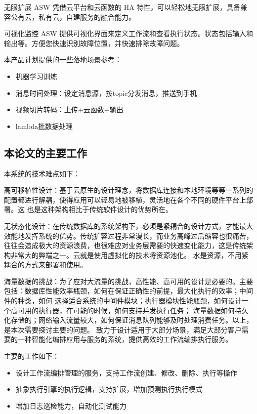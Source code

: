 无限扩展
ASW 凭借云平台和云函数的 HA 特性，可以轻松地无限扩展，具备兼容公有云，私有云，自建服务的融合能力。

可视化监控
ASW 提供可视化界面来定义工作流和查看执行状态。状态包括输入和输出等。方便您快速识别故障位置，并快速排除故障问题。


本产品计划提供的一些落地场景参考：

    \begin{itemize}
        \item 机器学习训练
        \item 消息时间处理：设定消息源，按topic分发消息，推送到手机
        \item 视频切片转码：上传+云函数+输出
        \item lambda批数据处理
    \end{itemize}



\subsection{本论文的主要工作}

本系统的技术难点如下：

高可移植性设计：基于云原生的设计理念，将数据库连接和本地环境等等一系列的配置都进行解耦，使得应用可以轻易地被移植，灵活地在各个不同的硬件平台上部署。这
也是这种架构相比于传统软件设计的优势所在\cite{othe2}。

无状态化设计：在传统数据库的系统架构下，必须是紧耦合的设计方式，才能最大效能地发挥系统的优势。传统扩容过程非常漫长，而业务高峰过后缩容也很痛苦，
往往会造成极大的资源浪费，也很难应对业务层需要的快速变化能力，这是传统架构非常大的弊端之一\cite{kube2021near}。云就是使用虚拟化的技术将资源池化。
水是资源，不用紧耦合的方式来部署和使用\cite{roberson2021dbspdrp}。

海量数据的挑战：为了应对大流量的挑战，高性能、高可用的设计是必要的。主要包括：数据库性能效率瓶颈，如何在保证正确性的前提，最大化执行的效率；中间件的种类，如何
选择适合系统的中间件模块；执行器模块性能瓶颈，如何设计一个高可用的执行器，在可能的时候，如何支持并发执行任务；
海量数据如何持久化存储的；网络输入流量较大，如何保证消息队列能够及时处理消费任务。以上，是本次需要探讨主要的问题。
致力于设计适用于大部分场景，满足大部分客户需要的一种智能化编排应用与服务的系统，提供高效的工作流编排执行服务。

主要的工作如下：
\begin{itemize}
    \item 设计工作流编排管理的服务，支持工作流创建、修改、删除、执行等操作
    \item 抽象执行引擎的执行逻辑，支持扩展，增加预测执行执行模式
    \item 增加日志巡检能力，自动化测试能力
\end{itemize}

